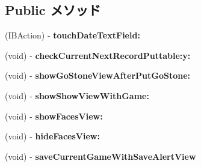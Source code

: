 \subsection*{Public メソッド}
\begin{DoxyCompactItemize}
\item 
\hypertarget{interface_record_regist_view_controller_ae0208bd22a30f70c0dc02a068cc8359e}{
(IBAction) -\/ {\bfseries touchDateTextField:}}
\label{interface_record_regist_view_controller_ae0208bd22a30f70c0dc02a068cc8359e}

\item 
\hypertarget{interface_record_regist_view_controller_ab472300710aa7420fc624539419b26e2}{
(void) -\/ {\bfseries checkCurrentNextRecordPuttable:y:}}
\label{interface_record_regist_view_controller_ab472300710aa7420fc624539419b26e2}

\item 
\hypertarget{interface_record_regist_view_controller_a01283e6c99094505960ae8726f8edf3c}{
(void) -\/ {\bfseries showGoStoneViewAfterPutGoStone:}}
\label{interface_record_regist_view_controller_a01283e6c99094505960ae8726f8edf3c}

\item 
\hypertarget{interface_record_regist_view_controller_aebf533cc12a3238acd6f17cb7077a746}{
(void) -\/ {\bfseries showShowViewWithGame:}}
\label{interface_record_regist_view_controller_aebf533cc12a3238acd6f17cb7077a746}

\item 
\hypertarget{interface_record_regist_view_controller_ad3da886fc450bea0353dff9e60d283a0}{
(void) -\/ {\bfseries showFacesView:}}
\label{interface_record_regist_view_controller_ad3da886fc450bea0353dff9e60d283a0}

\item 
\hypertarget{interface_record_regist_view_controller_affdb7b97169def5c86a402e0a5095ee7}{
(void) -\/ {\bfseries hideFacesView:}}
\label{interface_record_regist_view_controller_affdb7b97169def5c86a402e0a5095ee7}

\item 
\hypertarget{interface_record_regist_view_controller_a2177af289640900608fd2b85d1de6815}{
(void) -\/ {\bfseries saveCurrentGameWithSaveAlertView}}
\label{interface_record_regist_view_controller_a2177af289640900608fd2b85d1de6815}

\end{DoxyCompactItemize}
